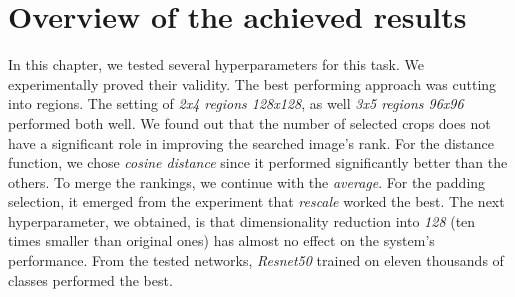 \section{Overview of the achieved results}

In this chapter, we tested several hyperparameters for this task. We experimentally proved their validity. The best performing approach was cutting into regions. The setting of \emph{2x4 regions 128x128}, as well \emph{3x5 regions 96x96} performed both well. We found out that the number of selected crops does not have a significant role in improving the searched image's rank. For the distance function, we chose \emph{cosine distance} since it performed significantly better than the others. To merge the rankings, we continue with the \emph{average}. For the padding selection, it emerged from the experiment that \emph{rescale} worked the best. The next hyperparameter, we obtained, is that dimensionality reduction into \emph{128} (ten times smaller than original ones) has almost no effect on the system's performance. From the tested networks, \emph{Resnet50} trained on eleven thousands of classes performed the best.
